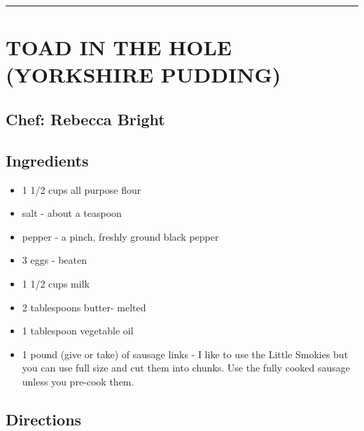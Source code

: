 \documentclass[
]{book}
\providecommand{\tightlist}{%
  \setlength{\itemsep}{0pt}\setlength{\parskip}{0pt}}
\begin{document}
\begin{center}\rule{0.5\linewidth}{0.5pt}\end{center}

\hypertarget{toad-in-the-hole-yorkshire-pudding}{%
\section*{TOAD IN THE HOLE (YORKSHIRE PUDDING)}\label{toad-in-the-hole-yorkshire-pudding}}


\hypertarget{chef-rebecca-bright-4}{%
\subsection*{Chef: Rebecca Bright}\label{chef-rebecca-bright-4}}


\hypertarget{ingredients-69}{%
\subsection*{Ingredients}\label{ingredients-69}}


\begin{itemize}
\tightlist
\item
  1 1/2 cups all purpose flour
\item
  salt - about a teaspoon
\item
  pepper - a pinch, freshly ground black pepper
\item
  3 eggs - beaten
\item
  1 1/2 cups milk
\item
  2 tablespoons butter- melted
\item
  1 tablespoon vegetable oil
\item
  1 pound (give or take) of sausage links - I like to use the Little Smokies but you can use full size and cut them into chunks. Use the fully cooked sausage unless you pre-cook them.
\end{itemize}

\hypertarget{directions-69}{%
\subsection*{Directions}\label{directions-69}}
\end{document}
